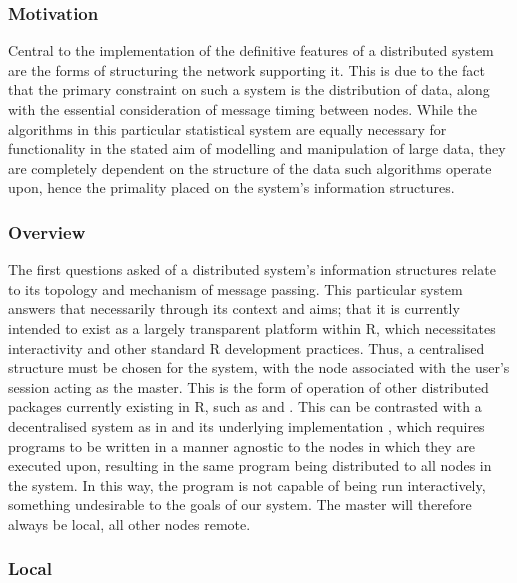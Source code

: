 \subsubsection{Motivation}\label{sec:topo-motivation}

Central to the implementation of the definitive features of a distributed system are the forms of structuring the network supporting it.
This is due to the fact that the primary constraint on such a system is the distribution of data, along with the essential consideration of message timing between nodes.
While the algorithms in this particular statistical system are equally necessary for functionality in the stated aim of modelling and manipulation of large data, they are completely dependent on the structure of the data such algorithms operate upon, hence the primality placed on the system's information structures.

\subsubsection{Overview}\label{overview}

The first questions asked of a distributed system's information structures relate to its topology and mechanism of message passing.
This particular system answers that necessarily through its context and aims; that it is currently intended to exist as a largely transparent platform within R, which necessitates interactivity and other standard R development practices.
Thus, a centralised structure must be chosen for the system, with the node associated with the user's \R{} session acting as the master.
This is the form of operation of other distributed packages currently existing in R, such as  and  \cites{luraschi20,tierney18}.
This can be contrasted with a decentralised system as in  and its underlying  implementation \cite{pbdR2012}, which requires \R{} programs to be written in a manner agnostic to the nodes in which they are executed upon, resulting in the same program being distributed to all nodes in the system.
In this way, the program is not capable of being run interactively, something undesirable to the goals of our system.
The master will therefore always be local, all other nodes remote.

\subsubsection{Local}\label{local}

